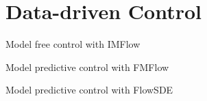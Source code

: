 \section{Data-driven Control}
\label{sec:methods:mpc}

Model free control with IMFlow

Model predictive control with FMFlow

Model predictive control with FlowSDE

